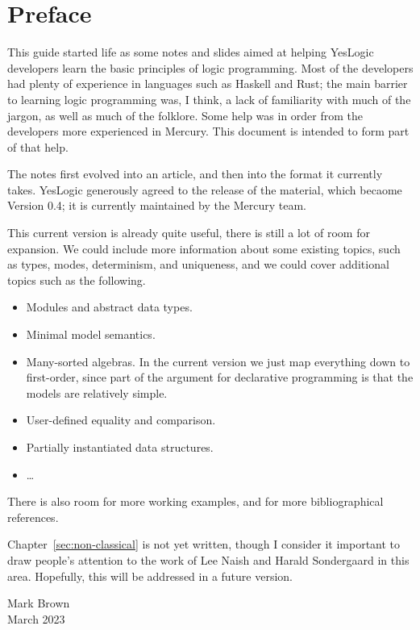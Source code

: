 \chapter{Preface}

This guide
started life as some notes and slides
aimed at helping YesLogic developers
learn the basic principles of logic programming.
Most of the developers had plenty of experience
in languages such as Haskell and Rust;
the main barrier to learning logic programming was, I think,
a lack of familiarity with much of the jargon,
as well as much of the folklore.
Some help was in order from the developers more experienced in Mercury.
This document is intended to form part of that help.

The notes first evolved into an article,
and then into the format it currently takes.
YesLogic generously agreed to the release of the material,
which becaome Version 0.4;
it is currently maintained by the Mercury team.

This current version is already quite useful,
there is still a lot of room for expansion.
We could include more information about some existing topics,
such as types, modes, determinism, and uniqueness,
and we could cover additional topics such as the following.
\begin{itemize}
\item
Modules and abstract data types.
\item
Minimal model semantics.
\item
Many-sorted algebras.
In the current version we just map everything down to first-order,
since part of the argument for declarative programming
is that the models are relatively simple.
\item
User-defined equality and comparison.
\item
Partially instantiated data structures.
\item
\ldots
\end{itemize}
There is also room for more working examples,
and for more bibliographical references.

Chapter~\ref{sec:non-classical} is not yet written,
though I consider it important to draw people's attention
to the work of Lee Naish and Harald Sondergaard in this area.
Hopefully, this will be addressed in a future version.

\bigskip
\noindent
Mark Brown \\
March 2023
